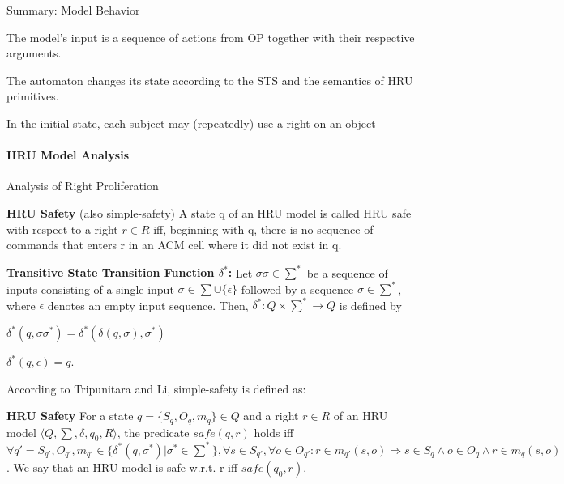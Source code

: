 \documentclass[a4paper]{article}
\renewcommand{\note}[2]{\begin{noteBox} \textbf{#1} #2 \end{noteBox}}
\begin{document}
\begin{multicols}{3}
    Summary: Model Behavior
    \begin{itemize*}
        \item The model’s input is a sequence of actions from OP together with their respective arguments.
        \item The automaton changes its state according to the STS and the semantics of HRU primitives.
        \item In the initial state, each subject may (repeatedly) use a right on an object
    \end{itemize*}

    \paragraph{HRU Model Analysis}
    Analysis of Right Proliferation
    \note{HRU Safety}{(also simple-safety) A state q of an HRU model is called HRU safe with respect to a right $r\in R$ iff, beginning with q, there is no sequence of commands that enters r in an ACM cell where it did not exist in q.}

    \note{Transitive State Transition Function $\delta^*$:}{Let $\sigma\sigma\in\sum^*$ be a sequence of inputs consisting of a single input $\sigma\in\sum\cup\{\epsilon\}$ followed by a sequence $\sigma\in\sum^*$, where $\epsilon$ denotes an empty input sequence. Then, $\delta^*:Q\times\sum^*\rightarrow Q$ is defined by
        \begin{itemize*}
            \item $\delta^*(q,\sigma\sigma^*)=\delta^*(\delta(q,\sigma),\sigma^*)$
            \item $\delta^*(q,\epsilon)=q$.
        \end{itemize*}
    }

    According to Tripunitara and Li, simple-safety is defined as:
    \note{HRU Safety}{For a state $q=\{S_q,O_q,m_q\}\in Q$ and a right $r\in R$ of an HRU model $\langle Q,\sum,\delta,q_0,R\rangle$, the predicate $safe(q,r)$ holds iff
    $\forall q'= S_{q'},O_{q'},m_{q'} \in \{\delta^*(q,\sigma^*)|\sigma^*\in\sum^*\},\forall s\in S_{q'},\forall o\in O_{q'}: r\in m_{q'}(s,o)\Rightarrow s\in S_q \wedge o\in O_q \wedge r\in m_q(s,o)$.
    We say that an HRU model is safe w.r.t. r iff $safe(q_0 ,r)$.}


\end{multicols}
\end{document}
